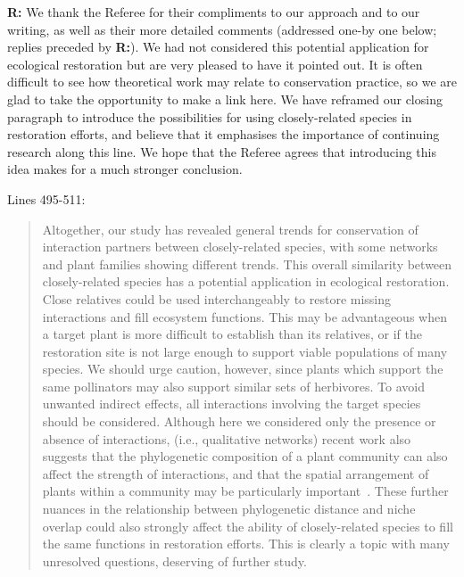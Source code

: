 \documentclass[12pt]{letter}
\begin{document}
	\textbf{R:} We thank the Referee for their compliments to our approach and to our writing, as well as their more detailed comments (addressed one-by one below; replies preceded by \textbf{R:}). We had not considered this potential application for ecological restoration but are very pleased to have it pointed out. It is often difficult to see how theoretical work may relate to conservation practice, so we are glad to take the opportunity to make a link here. We have reframed our closing paragraph to introduce the possibilities for using closely-related species in restoration efforts, and believe that it emphasises the importance of continuing research along this line. We hope that the Referee agrees that introducing this idea makes for a much stronger conclusion.


	Lines 495-511:

	\begin{quotation}

		Altogether, our study has revealed general trends for conservation of interaction
		partners between closely-related species, with some networks and plant 
		families showing different trends. This overall similarity between closely-related
		species has a potential application in ecological restoration. Close relatives could
		be used interchangeably to restore missing interactions and fill ecosystem functions. 
		This may be advantageous when a target plant is more difficult to establish than its
		relatives, or if the restoration site is not large enough to support viable populations 
		of many species. We should urge caution, however, since plants which support the
		same pollinators may also support similar sets of herbivores. To avoid unwanted 
		indirect effects, all interactions involving the target species should be considered.
		Although here we considered only the presence or absence of interactions,
		(i.e., qualitative networks)
		recent work also suggests that the phylogenetic composition of a plant
		community can also affect the strength of 
		interactions, and that the spatial arrangement of plants within a 
		community may be particularly important~\citep{Yguel2011,Castagneyrol2014}.
		These further nuances in the relationship between phylogenetic distance and 
		niche overlap could also strongly affect the ability of closely-related species to
		fill the same functions in restoration efforts. This is clearly a topic with many
		unresolved questions, deserving of further study.

	\end{quotation}
\end{document}
